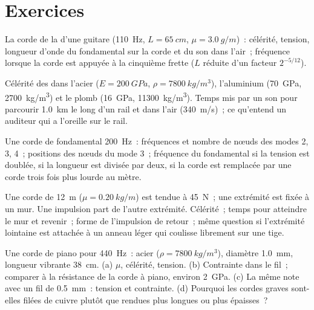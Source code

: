 \section{Exercices}

\begin{exercise}[$\star$]\label{exo:b2:waves-on-strings:1}
La corde de la d'une guitare (\qty{110}{Hz}, $L = \qty{65}{cm}$, $\mu = \qty{3.0}{g/m}$)~:
célérité, tension, longueur d'onde du fondamental sur la corde et
du son dans l'air~; fréquence lorsque la corde est appuyée à la cinquième
frette ($L$ réduite d'un facteur $2^{-5/12}$).
\end{exercise}

\begin{exercise}[$\star$]\label{exo:b2:waves-on-strings:2}
Célérité des  dans l'acier ($E = \qty{200}{GPa}$, $\rho =
\qty{7800}{kg/m^3}$), l'aluminium (\qty{70}{GPa}, \qty{2700}{kg/m^3}) et le plomb
(\qty{16}{GPa}, \qty{11300}{kg/m^3}). Temps mis par un son pour parcourir \qty{1.0}{km}
le long d'un rail et dans l'air (\qty{340}{m/s})~; ce qu'entend un auditeur qui a
l'oreille sur le rail.
\end{exercise}

\begin{exercise}[$\star$]\label{exo:b2:waves-on-strings:3}
Une corde de fondamental \qty{200}{Hz}~: fréquences et nombre de nœuds des
modes 2, 3, 4~; positions des nœuds du mode 3~; fréquence du
fondamental si la tension est doublée, si la longueur est divisée par deux, si la
corde est remplacée par une corde trois fois plus lourde au mètre.
\end{exercise}

\begin{exercise}[$\star$]\label{exo:b2:waves-on-strings:4}
Une corde de \qty{12}{m} ($\mu = \qty{0.20}{kg/m}$) est tendue à \qty{45}{N}~; une
extrémité est fixée à un mur. Une impulsion part de l'autre extrémité. Célérité~;
temps pour atteindre le mur et revenir~; forme de l'impulsion de retour~;
même question si l'extrémité lointaine est attachée à un anneau léger qui coulisse librement sur une
tige.
\end{exercise}

\begin{exercise}[$\star\star$]\label{exo:b2:waves-on-strings:5}
Une corde de piano pour \qty{440}{Hz}~: acier ($\rho = \qty{7800}{kg/m^3}$),
diamètre \qty{1.0}{mm}, longueur vibrante \qty{38}{cm}. (a) $\mu$, célérité,
tension. (b) Contrainte dans le fil~; comparer à la résistance de la corde à
piano, environ \qty{2}{GPa}. (c) La même note avec un fil de \qty{0.5}{mm}~: tension
et contrainte. (d) Pourquoi les cordes graves sont-elles filées de cuivre plutôt que rendues
plus longues ou plus épaisses~?
\end{exercise}

